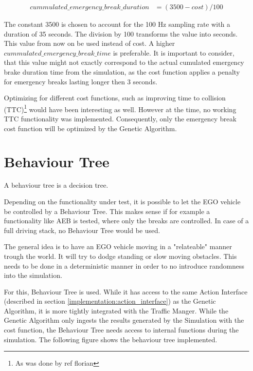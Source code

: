 \begin{equation} 
	\label{equ:modified_cost}
	\begin{split}
		cummulated\_emergency\_break\_duration & = (3500 - cost) / 100
	\end{split}
\end{equation}

The constant 3500 is chosen to account for the 100 Hz sampling rate with a duration of 35 seconds. The division by 100 transforms the value into seconds. This value from now on be used instead of cost. A higher $cummulated\_emergency\_break\_time$ is preferable. It is important to consider, that this value might not exactly correspond to the actual cumulated emergency brake duration time from the simulation, as the cost function applies a penalty for emergency breaks lasting longer then 3 seconds.

Optimizing for different cost functions, such as improving time to collision (TTC)\footnote{As was done by ref florian} would have been interesting as well. However at the time, no working TTC functionality was implemented. Consequently, only the emergency break cost function will be optimized by the Genetic Algorithm.

\section{Behaviour Tree}
A behaviour tree is a decision tree. 

Depending on the functionality under test, it is possible to let the EGO vehicle be controlled by a Behaviour Tree. This makes sense if for example a functionality like AEB is tested, where only the breaks are controlled. In case of a full driving stack, no Behaviour Tree would be used.

The general idea is to have an EGO vehicle moving in a "relateable" manner trough the world. It will try to dodge standing or slow moving obstacles. This needs to be done in a deterministic manner in order to no introduce randomness into the simulation.

For this, Behaviour Tree is used. While it has access to the same Action Interface (described in section \ref{implementation:action_interface}) as the Genetic Algorithm, it is more tightly integrated with the Traffic Manger. While the Genetic Algorithm only ingests the results generated by the Simulation with the cost function, the Behaviour Tree needs access to internal functions during the simulation. The following figure shows the behaviour tree implemented.




